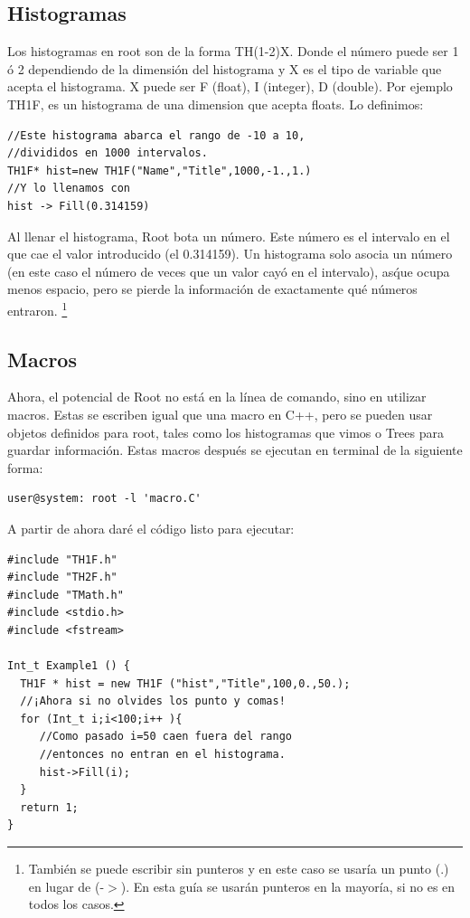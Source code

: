 \documentclass{article}
\begin{document}
\subsection{Histogramas}

Los histogramas en root son de la forma TH(1-2)X.
Donde el n\'umero puede ser 1 ó 2 dependiendo de la dimensi\'on del histograma y X es el tipo de variable que acepta el histograma. X puede ser F (float), I (integer), D (double).\newline
Por ejemplo TH1F, es un histograma de una dimension que acepta floats.
Lo definimos:
\begin{tcolorbox} [breakable]
\begin{verbatim}
//Este histograma abarca el rango de -10 a 10,
//divididos en 1000 intervalos.
TH1F* hist=new TH1F("Name","Title",1000,-1.,1.)
//Y lo llenamos con
hist -> Fill(0.314159)
\end{verbatim}
\end{tcolorbox}
Al llenar el histograma, Root bota un n\'umero. Este n\'umero es el intervalo en el que cae el valor introducido (el 0.314159). Un histograma solo asocia un n\'umero (en este caso el n\'umero de veces que un valor cay\'o en el intervalo), as\' que ocupa menos espacio, pero se pierde la informaci\'on de exactamente qu\'e n\'umeros entraron.
\footnote{Tambi\'en se puede escribir sin punteros y en este caso se usar\'ia un punto (.) en lugar de (-$>$). En esta gu\'ia se usar\'an punteros en la mayor\'ia, si no es en todos los casos.}
\subsection{Macros}

Ahora, el potencial de Root no est\'a en la l\'inea de comando, sino en utilizar macros. Estas se escriben igual que una macro en C++, pero se pueden usar objetos definidos para root, tales como los histogramas que vimos o Trees para guardar información. Estas macros despu\'es se ejecutan en terminal de la siguiente forma: \newline

\begin{tcolorbox} [breakable]
\begin{verbatim}
user@system: root -l 'macro.C'
\end{verbatim}
\end{tcolorbox}

A partir de ahora dar\'e el c\'odigo listo para ejecutar:

\begin{tcolorbox} [breakable]
\begin{verbatim}
#include "TH1F.h"
#include "TH2F.h"
#include "TMath.h"
#include <stdio.h>
#include <fstream>

Int_t Example1 () {
  TH1F * hist = new TH1F ("hist","Title",100,0.,50.);
  //¡Ahora si no olvides los punto y comas!
  for (Int_t i;i<100;i++ ){
     //Como pasado i=50 caen fuera del rango
     //entonces no entran en el histograma.
     hist->Fill(i);
  }
  return 1;
}
\end{verbatim}
\end{tcolorbox}
\end{document}
